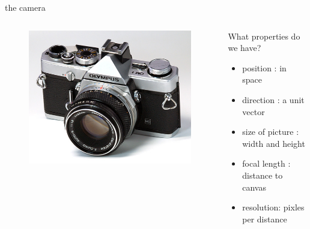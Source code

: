 \begin{frame}[fragile]{the camera}


\begin{columns}
 \begin{column}{0.5\linewidth}

\begin{figure}
 \includegraphics[scale=0.4]{olympusom1.jpg}
\end{figure}

 \end{column}

 \begin{column}{0.5\linewidth}
What properties do we have?
  \begin{itemize}
 \pause \item position : in space
 \pause \item direction : a unit vector 
 \pause \item size of picture : width and height
 \pause \item focal length : distance to canvas
 \pause \item resolution: pixles per distance
  \end{itemize}
 \end{column}

\end{columns}

\end{frame}

